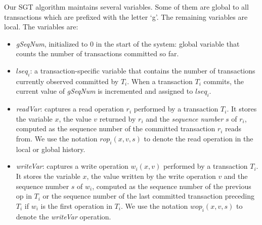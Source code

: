 \documentclass{llncs}
\newcommand{\cmnt}[1]{}
\newcommand{\Wset}{\textit{Wset}}
\newcommand{\Rset}{\textit{Rset}}
\newcommand{\op} {operation}
\newcommand{\gseqn}{\textit{gSeqNum}}
\newcommand{\rseq} {\textit{readSeqNum}}
\newcommand{\lseq} {\textit{lseq}}
\newcommand{\rvar} {\textit{readVar}}
\newcommand{\rop} {\textit{rop}}
\newcommand{\wvar} {\textit{writeVar}}
\newcommand{\wop} {\textit{wop}}
\newcommand{\sgt} {SGT}
\begin{document}
Our \sgt{} algorithm maintains several variables. Some of them are global to
all transactions which are prefixed with the letter `g'. The remaining
variables are local. The variables are: 
\begin{itemize}

\item \textit{\gseqn}, initialized to $0$ in the start of the system:
global variable that counts the number
of transactions committed so far. 


\item $\lseq_i$: a transaction-specific variable that contains the number of
transactions currently observed committed by $T_i$. 
When a transaction $T_i$ commits, the current value of \gseqn{} is
incremented and assigned to $\lseq_i$. 

\cmnt{
\item \textit{\rseq}: when a transaction $T_i$ performs a read \op{}
$r_i(x, v)$, the algorithm associates a sequence number \res{} with
the read \op. Suppose $r_i$'s reads $x$ from $T_j$ (a committed transaction). Then, $r_i$'s \rseq{} $\lseq_j$. We denote the
read's sequence number as $r_i(x, v).\rseq$. 
}


\item \textit{\rvar}: captures a read \op{} $r_i$ performed by a transaction
$T_i$. It stores the variable $x$, the value $v$
returned by $r_i$ and the \emph{sequence number} $s$ of $r_i$,
computed as the sequence number of the committed transaction $r_i$ reads from.
We use the notation $\rop_i(x, v, s)$ to denote the read \op{} in the
local or global history.

\cmnt{
\item $\Rset_i$, initialized to $\emptyset$: the set of all \rvar{}
\op{s} performed by $T_i$.  
\cmnt{If $T_i$ performs $r_i(x,v)$ then $x, v$ and the $\rseq{}$ are
stored in this list. }
}


\item \textit{\wvar}: captures a write \op{} $w_i(x, v)$ performed by
a transaction $T_i$. It stores the variable $x$, the value written by
the write \op{} $v$ and the sequence number $s$ of $w_i$,
computed as the sequence number of the previous op{} in $T_i$ or the
sequence number of the last committed transaction preceding $T_i$ if
$w_i$ is the first operation in $T_i$.
We use the notation $\wop_i(x, v, s)$ to denote the \wvar{} \op{}.


\cmnt{
\item $\Wset_i$, initialized to $\emptyset$: the set of all \wvar{}
\op{s} performed by $T_i$. 
}



\end{itemize}
\end{document}
